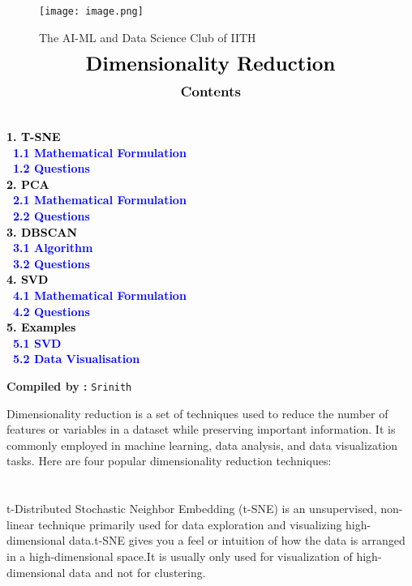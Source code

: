 \documentclass[12pt,a4paper]{article}
\begin{document}
\begin{center}
\begin{figure}[h]
\centering
\texttt{[image: image.png]}
\caption{{{\selectfont The AI-ML and Data Science Club of IITH}}}
\end{figure}
\end{center}
\begin{align*}
{\LARGE{\textbf{Dimensionality Reduction}}}
\end{align*}
\graphicspath{{./media/}}
\begin{align*}
\large{\textbf{{Contents}}}
\end{align*}
{\textcolor{black}{\textbf{
 \\
 1. {T-SNE}\\
 \indent \    \textcolor{blue}{1.1 Mathematical Formulation}\\
  \indent \    \textcolor{blue}{1.2 Questions}\\
 2. {PCA}\\
\indent \    \textcolor{blue}{2.1 Mathematical Formulation}\\
  \indent \    \textcolor{blue}{2.2 Questions}\\
 3. {DBSCAN}\\
 \indent \    \textcolor{blue}{3.1 Algorithm}\\
  \indent \    \textcolor{blue}{3.2 Questions}\\
 4. {SVD}\\
 \indent \    \textcolor{blue}{4.1 Mathematical Formulation}\\
  \indent \    \textcolor{blue}{4.2 Questions}\\
 5. {Examples}\\
 \indent \    \textcolor{blue}{5.1 SVD}\\
  \indent \    \textcolor{blue}{5.2 Data Visualisation}\\
}}
\begin{center}
    {\textbf{Compiled by :}
    \texttt{Srinith}}
\end{center}

\newpage
Dimensionality reduction is a set of techniques used to reduce the number of features or variables in a dataset while preserving important information. It is commonly employed in machine learning, data analysis, and data visualization tasks. Here are four popular dimensionality reduction techniques:

\section{}
t-Distributed Stochastic Neighbor Embedding (t-SNE) is an unsupervised, non-linear technique primarily used for data exploration and visualizing high-dimensional data.t-SNE gives you a feel or intuition of how the data is arranged in a high-dimensional space.It is usually only used for visualization of high-dimensional data and not for clustering.

}
\end{document}
